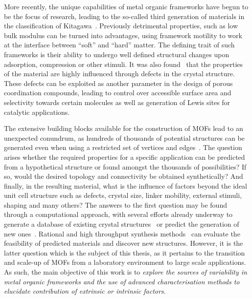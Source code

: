 More recently, the unique capabilities of metal organic frameworks
have begun to be the focus of research, leading to the so-called third 
generation of materials in the classification of 
Kitagawa~\cite{kondoMicroporousMaterialsConstructed2000}.
Previously detrimental properties, such as low bulk modulus
can be turned into advantages, using framework motility to 
work at the interface between ``soft'' and ``hard'' matter.
The defining trait of such frameworks is their ability to 
undergo well defined structural changes upon adsorption,
compression or other stimuli.
It was also found~\cite{valenzanoDisclosingComplexStructure2011} 
that the properties of the material are highly influenced
through defects in the crystal structure. These defects 
can be exploited as another parameter in the design of 
porous coordination compounds, leading to control over 
accessible surface area and selectivity towards certain molecules
as well as generation of Lewis sites for catalytic applications.

The extensive building blocks available for the construction 
of \glspl{MOF} lead to an unexpected conundrum, as hundreds of thousands
of potential structures can be generated even when using 
a restricted set of vertices and 
edges~\cite{wilmerLargescaleScreeningHypothetical2012}.
The question arises whether the required properties
for a specific application can be predicted from a hypothetical 
structure or found amongst the thousands of possibilities? 
If so, would the desired topology and connectivity be
obtained synthetically? And finally, in the resulting material,
what is the influence of factors beyond the ideal unit cell 
structure such as defects, crystal size, linker mobility, 
external stimuli, shaping and many others?
The answers to the first question may be found through a 
computational approach, with several efforts already underway 
to generate a database of existing crystal 
structures~\cite{chungComputationReadyExperimentalMetal2014, %
moghadamDevelopmentCambridgeStructural2017}
or predict the generation of new 
ones~\cite{raccugliaMachinelearningassistedMaterialsDiscovery2016}.
Rational and high throughput synthesis
methods~\cite{stockSynthesisMetalOrganicFrameworks2012} can 
evaluate the feasibility of predicted materials and discover 
new structures. However, it is the latter question which is
the subject of this thesis, as it pertains to the transition
and scale-up of \glspl{MOF} from a laboratory environment to 
large scale applications.
As such, the main objective of this work is to 
\textit{explore the sources of variability in metal organic 
frameworks and the use of advanced characterisation methods
to elucidate contribution of extrinsic or intrinsic factors}. 

